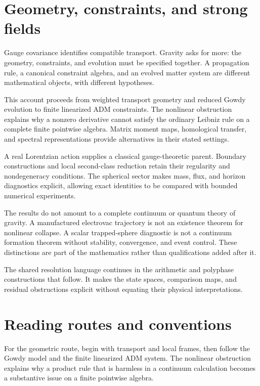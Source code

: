 \section*{Geometry, constraints, and strong fields}
Gauge covariance identifies compatible transport. Gravity asks for more: the geometry, constraints, and evolution must be specified together. A propagation rule, a canonical constraint algebra, and an evolved matter system are different mathematical objects, with different hypotheses.

This account proceeds from weighted transport geometry and reduced Gowdy evolution to finite linearized ADM constraints. The nonlinear obstruction explains why a nonzero derivative cannot satisfy the ordinary Leibniz rule on a complete finite pointwise algebra. Matrix moment maps, homological transfer, and spectral representations provide alternatives in their stated settings.

A real Lorentzian action supplies a classical gauge-theoretic parent. Boundary constructions and local second-class reduction retain their regularity and nondegeneracy conditions. The spherical sector makes mass, flux, and horizon diagnostics explicit, allowing exact identities to be compared with bounded numerical experiments.

The results do not amount to a complete continuum or quantum theory of gravity. A manufactured electrovac trajectory is not an existence theorem for nonlinear collapse. A scalar trapped-sphere diagnostic is not a continuum formation theorem without stability, convergence, and event control. These distinctions are part of the mathematics rather than qualifications added after it.

The shared resolution language continues in the arithmetic and polyphase constructions that follow. It makes the state spaces, comparison maps, and residual obstructions explicit without equating their physical interpretations.

\clearpage
\section*{Reading routes and conventions}
For the geometric route, begin with transport and local frames, then follow the Gowdy model and the finite linearized ADM system. The nonlinear obstruction explains why a product rule that is harmless in a continuum calculation becomes a substantive issue on a finite pointwise algebra.

